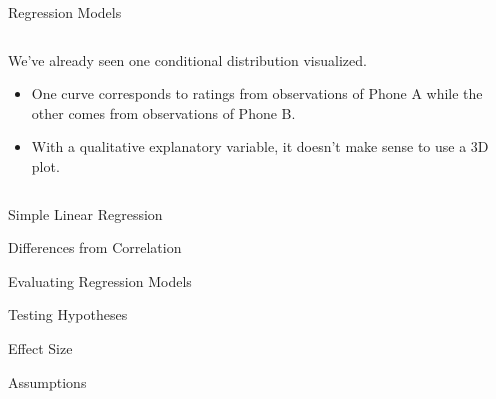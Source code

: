 \documentclass{beamer}
\begin{document}
\begin{frame}{Regression Models}
  
  \begin{columns}
    \begin{column}{0.5\textwidth}
      We've already seen one conditional distribution visualized.
      \va
      \begin{itemize}
      \item One curve corresponds to ratings from observations of Phone A while
        the other comes from observations of Phone B.
        \va
      \item With a qualitative explanatory variable, it doesn't make sense to
        use a 3D plot.
      \end{itemize}
    \end{column}
    
    \begin{column}{0.5\textwidth}
            
    \end{column}
  \end{columns}
  
\end{frame}

\watermarkon

\begin{frame}{Simple Linear Regression}
\end{frame}


\begin{frame}{Differences from Correlation}
\end{frame}


\begin{frame}{Evaluating Regression Models}
\end{frame}


\begin{frame}{Testing Hypotheses}
\end{frame}


\begin{frame}{Effect Size}
\end{frame}


\begin{frame}{Assumptions}
\end{frame}



%
%  
%  
%
\end{document}
